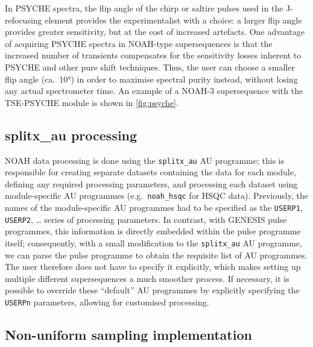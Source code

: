 \documentclass[a4paper,11pt]{article}
\newcommand{\carbon}{\ch{^{13}C}}
\begin{document}
\begin{refsection}
In PSYCHE spectra, the flip angle of the chirp or saltire pulses used in the J-refocusing element provides the experimentalist with a choice: a larger flip angle provides greater sensitivity, but at the cost of increased artefacts.\autocite{Foroozandeh2018CEJ}
One advantage of acquiring PSYCHE spectra in NOAH-type supersequences is that the increased number of transients compensates for the sensitivity losses inherent to PSYCHE and other pure shift techniques.
Thus, the user can choose a smaller flip angle (ca.\ \ang{10}) in order to maximise spectral purity instead, without losing any actual spectrometer time.
An example of a NOAH-3 supersequence with the TSE-PSYCHE module is shown in \cref{fig:psyche}.

\subsection{splitx\_au processing}
\label{subsec:splitx_au}

NOAH data processing is done using the \texttt{splitx\_au} AU programme; this is responsible for creating separate datasets containing the data for each module, defining any required processing parameters, and processing each dataset using module-specific AU programmes (e.g.\ \texttt{noah\_hsqc} for \carbon{} HSQC data).
Previously, the names of the module-specific AU programmes had to be specified as the \texttt{USERP1}, \texttt{USERP2}, \ldots{} series of processing parameters.
In contrast, with GENESIS pulse programmes, this information is directly embedded within the pulse programme itself; consequently, with a small modification to the \texttt{splitx\_au} AU programme, we can parse the pulse programme to obtain the requisite list of AU programmes.
The user therefore does not have to specify it explicitly, which makes setting up multiple different supersequences a much smoother process.
If necessary, it is possible to override these ``default'' AU programmes by explicitly specifying the \texttt{USERPn} parameters, allowing for customised processing.

\subsection{Non-uniform sampling implementation}
\label{subsec:nus}


\end{refsection}
\end{document}
